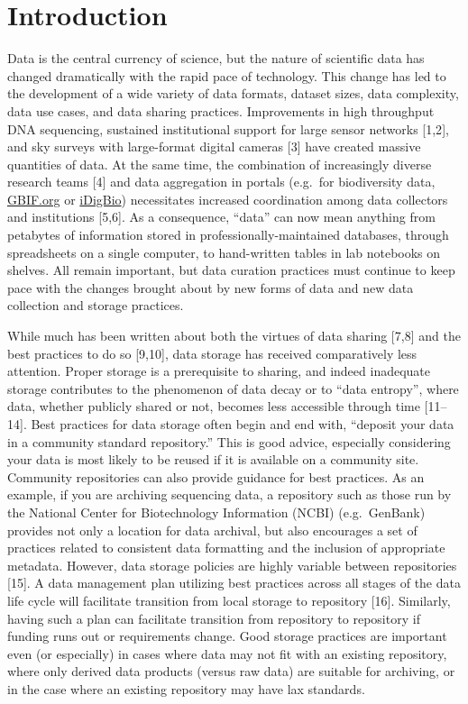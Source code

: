 \documentclass[10pt,letterpaper]{article}
\begin{document}
\section*{Introduction}\label{introduction}

Data is the central currency of science, but the nature of scientific
data has changed dramatically with the rapid pace of technology. This
change has led to the development of a wide variety of data formats,
dataset sizes, data complexity, data use cases, and data sharing
practices. Improvements in high throughput DNA sequencing, sustained
institutional support for large sensor networks {[}1,2{]}, and sky
surveys with large-format digital cameras {[}3{]} have created massive
quantities of data. At the same time, the combination of increasingly
diverse research teams {[}4{]} and data aggregation in portals (e.g.~for
biodiversity data, \href{http://gbif.org/}{GBIF.org} or
\href{https://www.idigbio.org/portal/}{iDigBio}) necessitates increased
coordination among data collectors and institutions {[}5,6{]}. As a
consequence, ``data'' can now mean anything from petabytes of
information stored in professionally-maintained databases, through
spreadsheets on a single computer, to hand-written tables in lab
notebooks on shelves. All remain important, but data curation practices
must continue to keep pace with the changes brought about by new forms
of data and new data collection and storage practices.

While much has been written about both the virtues of data sharing
{[}7,8{]} and the best practices to do so {[}9,10{]}, data storage has
received comparatively less attention. Proper storage is a prerequisite
to sharing, and indeed inadequate storage contributes to the phenomenon
of data decay or to ``data entropy'', where data, whether publicly
shared or not, becomes less accessible through time {[}11--14{]}. Best
practices for data storage often begin and end with, ``deposit your data
in a community standard repository.'' This is good advice, especially
considering your data is most likely to be reused if it is available on
a community site. Community repositories can also provide guidance for
best practices. As an example, if you are archiving sequencing data, a
repository such as those run by the National Center for Biotechnology
Information (NCBI) (e.g.~GenBank) provides not only a location for data
archival, but also encourages a set of practices related to consistent
data formatting and the inclusion of appropriate metadata. However, data
storage policies are highly variable between repositories {[}15{]}. A
data management plan utilizing best practices across all stages of the
data life cycle will facilitate transition from local storage to
repository {[}16{]}. Similarly, having such a plan can facilitate
transition from repository to repository if funding runs out or
requirements change. Good storage practices are important even (or
especially) in cases where data may not fit with an existing repository,
where only derived data products (versus raw data) are suitable for
archiving, or in the case where an existing repository may have lax
standards.
\end{document}
